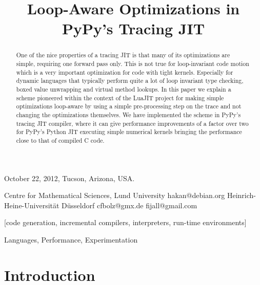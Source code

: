 \documentclass[preprint]{sigplanconf}
\begin{document}
 {October 22, 2012, Tucson, Arizona, USA.}


\title{Loop-Aware Optimizations in PyPy's Tracing JIT}

           {Centre for Mathematical Sciences, Lund University}
           {hakan@debian.org}
           {Heinrich-Heine-Universität Düsseldorf}
           {cfbolz@gmx.de}
           {}
           {fijall@gmail.com}

\maketitle

\begin{abstract}
One of the nice properties of a tracing JIT is that many of its optimizations
are simple, requiring one forward pass only. This is not true for loop-invariant code
motion which is a very important optimization for code with tight kernels.
Especially for dynamic languages that typically perform quite a lot of loop invariant
type checking, boxed value unwrapping and virtual method lookups.
In this paper we explain a scheme pioneered within the context of the LuaJIT project
for making simple optimizations loop-aware by
using a simple pre-processing step on the trace and not changing the
optimizations themselves.
We have implemented the scheme in PyPy's tracing JIT compiler,
where it can give performance improvements of a
factor over two for PyPy's Python JIT executing simple numerical kernels
bringing the performance close to that of compiled C code.
\end{abstract}

[code generation,
incremental compilers, interpreters, run-time environments]

\terms
Languages, Performance, Experimentation


\section{Introduction}
\end{document}
